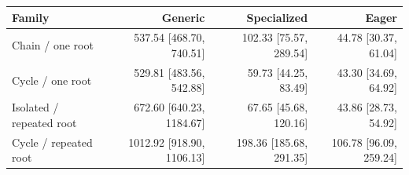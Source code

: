 \begin{tabular}{lrrr}
\toprule
Family & Generic & Specialized & Eager \\
\midrule
Chain / one root & 537.54 [468.70, 740.51] & 102.33 [75.57, 289.54] & 44.78 [30.37, 61.04] \\
Cycle / one root & 529.81 [483.56, 542.88] & 59.73 [44.25, 83.49] & 43.30 [34.69, 64.92] \\
Isolated / repeated root & 672.60 [640.23, 1184.67] & 67.65 [45.68, 120.16] & 43.86 [28.73, 54.92] \\
Cycle / repeated root & 1012.92 [918.90, 1106.13] & 198.36 [185.68, 291.35] & 106.78 [96.09, 259.24] \\
\bottomrule
\end{tabular}
